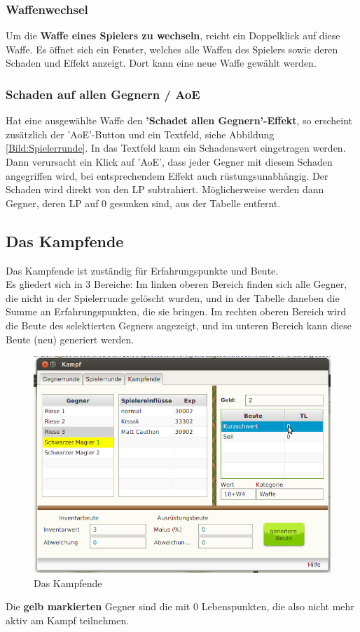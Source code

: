 \documentclass[11pt, a4paper, german]{article}
\begin{document}
\subsubsection{Waffenwechsel}
Um die \textbf{Waffe eines Spielers zu wechseln}, reicht ein Doppelklick auf diese Waffe. Es öffnet sich ein Fenster, welches alle Waffen des Spielers sowie deren Schaden und Effekt anzeigt. Dort kann eine neue Waffe gewählt werden.

\subsubsection{Schaden auf allen Gegnern / AoE}\label{Abschnitt:aoe}
Hat eine ausgewählte Waffe den \textbf{'Schadet allen Gegnern'-Effekt}, so erscheint zusätzlich der 'AoE'-Button und ein Textfeld, siehe Abbildung \ref{Bild:Spielerrunde}. In das Textfeld kann ein Schadenswert eingetragen werden. Dann verursacht ein Klick auf 'AoE', dass jeder Gegner mit diesem Schaden angegriffen wird, bei entsprechendem Effekt auch rüstungsunabhängig. Der Schaden wird direkt von den LP subtrahiert. Möglicherweise werden dann Gegner, deren LP auf 0 gesunken sind, aus der Tabelle entfernt.

\subsection{Das Kampfende}\label{Abschnitt:Kampfende}
Das Kampfende ist zuständig für Erfahrungspunkte und Beute.\\
Es gliedert sich in 3 Bereiche: Im linken oberen Bereich finden sich alle Gegner, die nicht in der Spielerrunde gelöscht wurden, und in der Tabelle daneben die Summe an Erfahrungspunkten, die sie bringen. Im rechten oberen Bereich wird die Beute des selektierten Gegners angezeigt, und im unteren Bereich kann diese Beute (neu) generiert werden.\\
\begin{figure}
\centering
\includegraphics[width=\linewidth]{Bilder/Kampfende.png}
\caption{Das Kampfende}
\label{Bild:Kampfende}
\end{figure}
Die \textbf{gelb markierten} Gegner sind die mit 0 Lebenspunkten, die also nicht mehr aktiv am Kampf teilnehmen.\\
\end{document}
